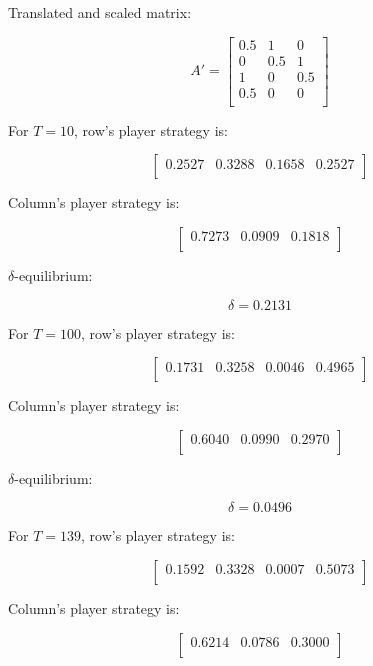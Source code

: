 \documentclass[a4paper,11pt,oneside,onecolumn]{article}
\begin{document}
Translated and scaled matrix:

$$
A' = \left[\begin{array}{ccc}
0.5 & 1 & 0 \\
0 & 0.5 & 1 \\
1 & 0 & 0.5 \\
0.5 & 0 & 0 \\
\end{array}\right]
$$

For $T=10$, row's player strategy is:

$$
\left[\begin{array}{cccc}
0.2527 & 0.3288 & 0.1658 & 0.2527 \\
\end{array}\right]
$$

Column's player strategy is:

$$
\left[\begin{array}{ccc}
0.7273 & 0.0909 & 0.1818 \\
\end{array}\right]
$$

$\delta$-equilibrium:

$$
\delta = 0.2131
$$

For $T=100$, row's player strategy is:

$$
\left[\begin{array}{cccc}
0.1731 & 0.3258 & 0.0046 & 0.4965 \\
\end{array}\right]
$$

Column's player strategy is:

$$
\left[\begin{array}{ccc}
0.6040 & 0.0990 & 0.2970 \\
\end{array}\right]
$$

$\delta$-equilibrium:

$$
\delta = 0.0496
$$

For $T=139$, row's player strategy is:

$$
\left[\begin{array}{cccc}
0.1592 & 0.3328 & 0.0007 & 0.5073 \\
\end{array}\right]
$$

Column's player strategy is:

$$
\left[\begin{array}{ccc}
0.6214 & 0.0786 & 0.3000 \\
\end{array}\right]
$$
\end{document}
